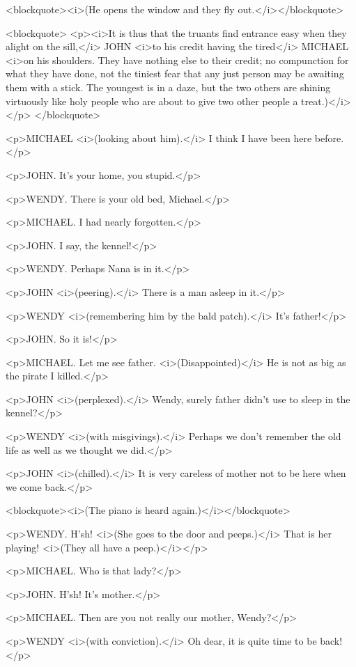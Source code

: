 <blockquote><i>(He opens the window and they fly
out.</i></blockquote>

<blockquote>
<p><i>It is thus that the truants find entrance easy when they alight
on the sill,</i> JOHN <i>to his credit having the tired</i> MICHAEL
<i>on his shoulders. They have nothing else to their credit; no
compunction for what they have done, not the tiniest fear that any
just person may be awaiting them with a stick. The youngest is in a
daze, but the two others are shining virtuously like holy people who
are about to give two other people a treat.)</i></p>
</blockquote>

<p>MICHAEL <i>(looking about him).</i> I think I have been here
before.</p>

<p>JOHN. It's your home, you stupid.</p>

<p>WENDY. There is your old bed, Michael.</p>

<p>MICHAEL. I had nearly forgotten.</p>

<p>JOHN. I say, the kennel!</p>

<p>WENDY. Perhaps Nana is in it.</p>

<p>JOHN <i>(peering).</i> There is a man asleep in it.</p>

<p>WENDY <i>(remembering him by the bald patch).</i> It's father!</p>

<p>JOHN. So it is!</p>

<p>MICHAEL. Let me see father. <i>(Disappointed)</i> He is not as big
as the pirate I killed.</p>

<p>JOHN <i>(perplexed).</i> Wendy, surely father didn't use to sleep
in the kennel?</p>

<p>WENDY <i>(with misgivings).</i> Perhaps we don't remember the old
life as well as we thought we did.</p>

<p>JOHN <i>(chilled).</i> It is very careless of mother not to be
here when we come back.</p>

<blockquote><i>(The piano is heard again.)</i></blockquote>

<p>WENDY. H'sh! <i>(She goes to the door and peeps.)</i> That is her
playing! <i>(They all have a peep.)</i></p>

<p>MICHAEL. Who is that lady?</p>

<p>JOHN. H'sh! It's mother.</p>

<p>MICHAEL. Then are you not really our mother, Wendy?</p>

<p>WENDY <i>(with conviction).</i> Oh dear, it is quite time to be
back!</p>

